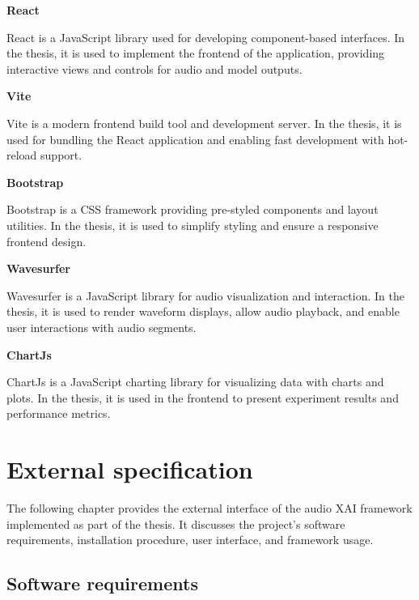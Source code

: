 \documentclass[
    bindingoffset=5mm,  %
    footnoteindent=3mm, %
    hyphenation=true    %
]{src/wut-thesis}
\begin{document}
\begin{description}
\item \textbf{React \cite{ReactDOC}}

React is a JavaScript library used for developing component-based interfaces.
In the thesis, it is used to implement the frontend of the application, providing
interactive views and controls for audio and model outputs.

\item \textbf{Vite \cite{ViteDOC}}

Vite is a modern frontend build tool and development server. In the thesis, it 
is used for bundling the React application and enabling fast development with hot-reload support.

\item \textbf{Bootstrap \cite{BootstrapDOC}}

Bootstrap is a CSS framework providing pre-styled components and layout utilities.
In the thesis, it is used to simplify styling and ensure a responsive frontend design.

\item \textbf{Wavesurfer \cite{WavesurferDOC}}

Wavesurfer is a JavaScript library for audio visualization and interaction.
In the thesis, it is used to render waveform displays, allow audio playback,
and enable user interactions with audio segments.

\item \textbf{ChartJs \cite{ChartJsDoc}}

ChartJs is a JavaScript charting library for visualizing data with charts and plots.
In the thesis, it is used in the frontend to present experiment results and performance metrics.

\end{description}

%
%
\clearpage %
\section{External specification} \label{ch:externalSpec}

The following chapter provides the external interface of the audio XAI framework implemented as
part of the thesis. It discusses the project's software requirements, installation procedure,
user interface, and framework usage.

\subsection{Software requirements} \label{ch4:DevelopmentSetup}
\end{document}
